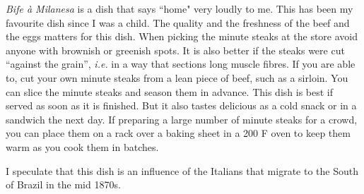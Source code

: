\documentclass[11pt,letterpaper]{article}
\begin{document}


{\em Bife \`a Milanesa} is a dish that says ``home" very loudly to me. This has been my favourite dish since I was a child. The quality and the freshness of the beef and the eggs matters for this dish. When picking the minute steaks at the store avoid anyone with brownish or greenish spots. It is also better if the steaks were cut ``against the grain'', {\em i.e.} in a way that sections long muscle fibres. If you are able to, cut your own minute steaks from a lean piece of beef, such as a sirloin. You can slice the minute steaks and season them in advance. This dish is best if served as soon as it is finished. But it also tastes delicious as a cold snack or in a sandwich the next day. If preparing a large number of minute steaks for a crowd, you can place them on a rack over a baking sheet in a 200 F oven to keep them warm as you cook them in batches.

I speculate that this dish is an influence of the Italians that migrate to the South of Brazil in the mid 1870s.

\vspace{.3in}
\end{document}
